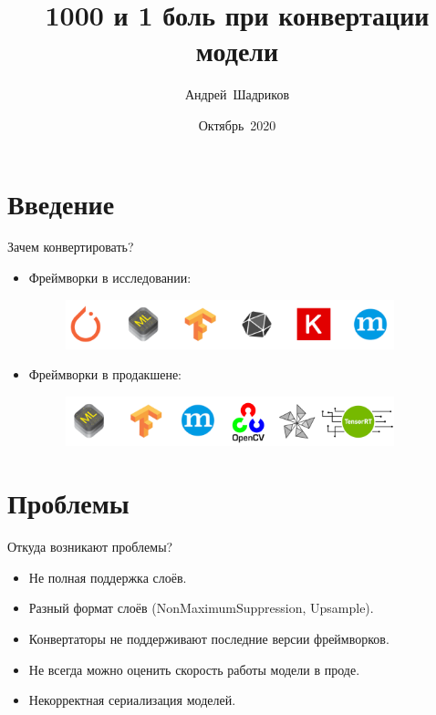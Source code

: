 \documentclass[mathserif,serif,unicode]{beamer}
\title{1000 и 1 боль при конвертации модели}
\author{Андрей~Шадриков\\
}
\date{Октябрь~2020}
\begin{document}
\begin{frame}[plain]
  \titlepage
\end{frame}

\section{Введение}

\begin{frame}{Зачем конвертировать?}

\begin{itemize}
    \item Фреймворки в исследовании:\\
    \begin{figure}[h]
        \centering
        \includegraphics[width=0.9\textwidth]{images/high-level.png}
    \end{figure}
\vspace{5mm}
    \item Фреймворки в продакшене:\\
    \begin{figure}
        \centering
        \includegraphics[width=0.9\textwidth]{images/low-level.png}
    \end{figure}
\end{itemize}

\end{frame}

\section{Проблемы}

\begin{frame}{Откуда возникают проблемы?}

\begin{itemize}
    \item Не полная поддержка слоёв.
    \item Разный формат слоёв (NonMaximumSuppression, Upsample).
    \item Конвертаторы не поддерживают последние версии фреймворков.
    \item Не всегда можно оценить скорость работы модели в проде.
    \item Некорректная сериализация моделей.
\end{itemize}
    
\end{frame}
\end{document}

